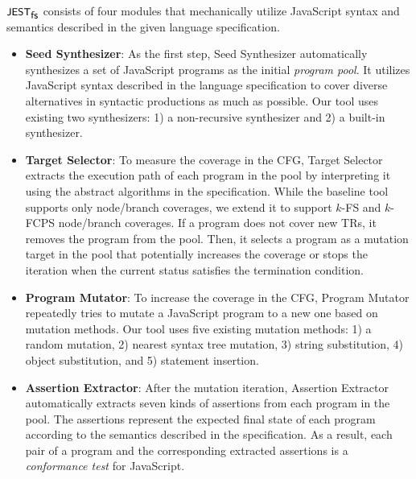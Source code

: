 $\textsf{\small JEST}_{\textsf{\small fs}}$ consists of four modules that mechanically utilize JavaScript syntax and
semantics described in the given language specification.
\begin{itemize}
  \item \textsf{\textbf{Seed Synthesizer}}:
    As the first step, \textsf{Seed Synthesizer} automatically synthesizes a set
    of JavaScript programs as the initial \textit{program pool}.
    It utilizes JavaScript syntax described in the language specification to
    cover diverse alternatives in syntactic productions as much as possible.
    Our tool uses existing two synthesizers: 1) a non-recursive synthesizer and
    2) a built-in synthesizer.
  \item \textsf{\textbf{Target Selector}}:
    To measure the coverage in the CFG, \textsf{Target Selector} extracts the
    execution path of each program in the pool by interpreting it using the
    abstract algorithms in the specification.
    While the baseline tool supports only node/branch coverages, we extend it to
    support $k$-FS and $k$-FCPS node/branch coverages.
    If a program does not cover new TRs, it removes the program from the pool.
    Then, it selects a program as a mutation target in the pool that potentially
    increases the coverage or stops the iteration when the current status
    satisfies the termination condition.
  \item \textsf{\textbf{Program Mutator}}:
    To increase the coverage in the CFG, \textsf{Program Mutator} repeatedly
    tries to mutate a JavaScript program to a new one based on mutation methods.
    Our tool uses five existing mutation methods: 1) a random mutation, 2)
    nearest syntax tree mutation, 3) string substitution, 4) object
    substitution, and 5) statement insertion.
  \item \textsf{\textbf{Assertion Extractor}}:
    After the mutation iteration, \textsf{Assertion Extractor} automatically
    extracts seven kinds of assertions from each program in the pool.
    The assertions represent the expected final state of each program according
    to the semantics described in the specification.
    As a result, each pair of a program and the corresponding extracted
    assertions is a \textit{conformance test} for JavaScript.
\end{itemize}


